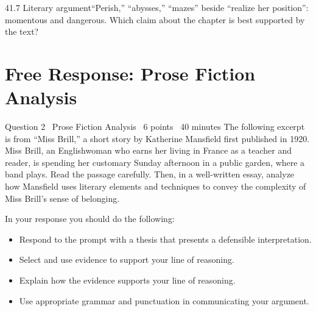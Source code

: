 \documentclass[11pt]{article}
\begin{document}
\begin{q}{4}{1.7 Literary argument}{``Perish,'' ``abysses,'' ``mazes'' beside ``realize her position'': momentous and dangerous.}
Which claim about the chapter is best supported by the text?
\end{q}

\section{Free Response: Prose Fiction Analysis}

\begin{frq}{Question 2 \textperiodcentered\ Prose Fiction Analysis \textperiodcentered\ 6 points \textperiodcentered\ 40 minutes}
The following excerpt is from ``Miss Brill,'' a short story by Katherine Mansfield first published in 1920. Miss Brill, an Englishwoman who earns her living in France as a teacher and reader, is spending her customary Sunday afternoon in a public garden, where a band plays. Read the passage carefully. Then, in a well-written essay, analyze how Mansfield uses literary elements and techniques to convey the complexity of Miss Brill's sense of belonging.

In your response you should do the following:
\begin{itemize}[leftmargin=1.4em]
\item Respond to the prompt with a thesis that presents a defensible interpretation.
\item Select and use evidence to support your line of reasoning.
\item Explain how the evidence supports your line of reasoning.
\item Use appropriate grammar and punctuation in communicating your argument.
\end{itemize}
\end{frq}
\end{document}
